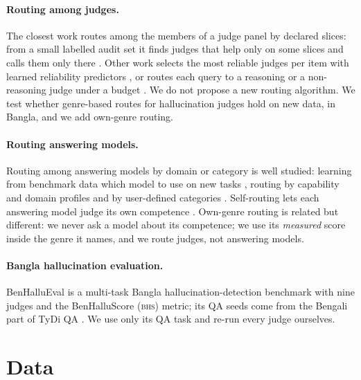 \documentclass[pdflatex,sn-apa]{sn-jnl}
\newcommand{\BHS}{\textsc{bhs}}
\begin{document}
\paragraph{Routing among judges.} The closest work routes among the members of a judge panel by declared slices: from
a small labelled audit set it finds judges that help only on some slices and calls them only there
\citep{judgepanels2026}. Other work selects the most reliable judges per item with learned reliability predictors
\citep{juryondemand2025}, or routes each query to a reasoning or a non-reasoning judge under a budget
\citep{racer2026}. We do not propose a new routing algorithm. We test whether genre-based routes for hallucination
judges hold on new data, in Bangla, and we add own-genre routing.

\paragraph{Routing answering models.} Routing among answering models by domain or category is well studied:
learning from benchmark data which model to use on new tasks \citep{shnitzer2023routing}, routing by capability and
domain profiles \citep{inferencedynamics2025} and by user-defined categories \citep{archrouter2025}. Self-routing lets
each answering model judge its own competence \citep{disrouter2025}. Own-genre routing is related but different: we
never ask a model about its competence; we use its \emph{measured} score inside the genre it names, and we route judges,
not answering models.

\paragraph{Bangla hallucination evaluation.} BenHalluEval \citep{benhallueval} is a multi-task Bangla
hallucination-detection benchmark with nine judges and the BenHalluScore (\BHS{}) metric; its QA seeds come from the
Bengali part of TyDi QA \citep{clark2020tydi}. We use only its QA task and re-run every judge ourselves.

\section{Data}\label{sec:data}
\end{document}
